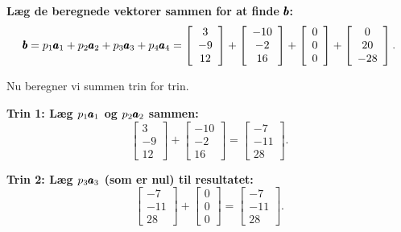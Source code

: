 \begin{solution}
    \textbf{Læg de beregnede vektorer sammen for at finde $\pmb{b}$:}
    \[
    \pmb{b} = p_1 \pmb{a}_1 + p_2 \pmb{a}_2 + p_3 \pmb{a}_3 + p_4 \pmb{a}_4 = \left[\begin{array}{c}
    3 \\
    -9 \\
    12
    \end{array}\right] + \left[\begin{array}{c}
    -10 \\
    -2 \\
    16
    \end{array}\right] + \left[\begin{array}{c}
    0 \\
    0 \\
    0
    \end{array}\right] + \left[\begin{array}{c}
    0 \\
    20 \\
    -28
    \end{array}\right].
    \]
    
    Nu beregner vi summen trin for trin.
    
    \textbf{Trin 1: Læg $p_1 \pmb{a}_1$ og $p_2 \pmb{a}_2$ sammen:}
    \[
    \left[\begin{array}{c}
    3 \\
    -9 \\
    12
    \end{array}\right] + \left[\begin{array}{c}
    -10 \\
    -2 \\
    16
    \end{array}\right] = \left[\begin{array}{c}
    -7 \\
    -11 \\
    28
    \end{array}\right].
    \]
    
    \textbf{Trin 2: Læg $p_3 \pmb{a}_3$ (som er nul) til resultatet:}
    \[
    \left[\begin{array}{c}
    -7 \\
    -11 \\
    28
    \end{array}\right] + \left[\begin{array}{c}
    0 \\
    0 \\
    0
    \end{array}\right] = \left[\begin{array}{c}
    -7 \\
    -11 \\
    28
    \end{array}\right].
    \]
    

\end{solution}
